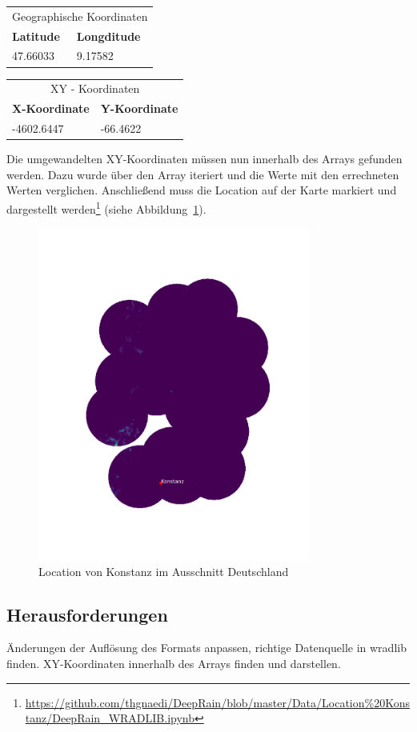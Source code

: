 \begin{table}[H]
\centering
\begin{tabularx}{8cm}{X|X}
\multicolumn{2}{c}{Geographische Koordinaten}\\
\textbf{Latitude} & \textbf{Longditude}\\\hline
47.66033          & 9.17582\\
\end{tabularx} 	
\end{table}

\begin{table}[H]
\centering
\begin{tabularx}{8cm}{X|X}
\multicolumn{2}{c}{XY - Koordinaten}\\
\textbf{X-Koordinate} & \textbf{Y-Koordinate}\\\hline
-4602.6447            & -66.4622\\
\end{tabularx} 	
\end{table}

Die umgewandelten XY-Koordinaten müssen nun innerhalb des Arrays gefunden werden. Dazu wurde über den Array iteriert und die Werte mit den errechneten Werten verglichen. Anschließend muss die Location auf der Karte markiert und dargestellt werden\footnote{\url{https://github.com/thgnaedi/DeepRain/blob/master/Data/Location\%20Konstanz/DeepRain_WRADLIB.ipynb}} (siehe Abbildung~\ref{fig:location}).

\begin{figure}[H]
	\centering
	\includegraphics[width=0.8\textwidth]{pics/Location}
	\caption{Location von Konstanz im Ausschnitt Deutschland}
	\label{fig:location}
\end{figure}

\subsection{Herausforderungen} 
Änderungen der Auflösung des Formats anpassen, richtige Datenquelle in wradlib finden. XY-Koordinaten innerhalb des Arrays finden und darstellen.
